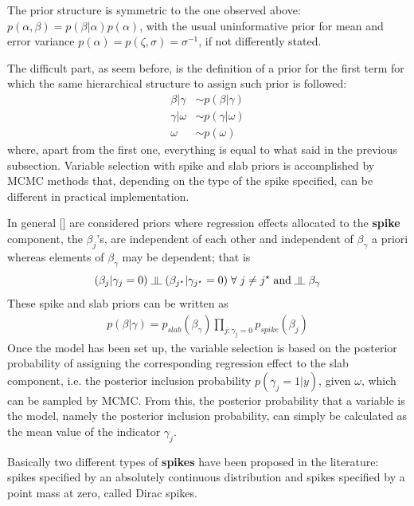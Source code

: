 \documentclass[11 pt]{article}
\begin{document}
\begin{multicols}{2}
The prior structure is symmetric to the one observed above: $p(\alpha, \beta) = p(\beta|\alpha)p(\alpha)$, 
with the usual uninformative prior for mean and error variance $p(\alpha) = p(\zeta, \sigma) = \sigma^{-1}$, if not differently stated.

The difficult part, as seem before, is the definition of a prior for the first term for which the same hierarchical structure to assign such prior is followed:
\begin{align*}
    \beta|\gamma &\sim p(\beta|\gamma)\\
    \gamma|\omega&\sim p(\gamma|\omega)\\
    \omega &\sim p(\omega)
\end{align*}
where, apart from the first one, everything is equal to what said in the previous subsection. Variable selection with spike and slab priors is accomplished by MCMC methods that, depending on the type of the spike specified, can be different in practical implementation.

\newcommand{\indep}{\rotatebox[origin=c]{90}{$\models$}}

In general [\cite{Spike2011}] are considered priors where regression effects allocated to the \textbf{spike} component, the $\beta_j$'s, are independent of each other and independent of $\beta_\gamma$ a priori whereas elements of $\beta_\gamma$ may be dependent; that is $$(\beta_j|\gamma_j = 0) \; \indep \; (\beta_{j^\star}|\gamma_{j^\star}=0) \; \forall \;j \neq j^\star\; \text{and} \;\indep \;\beta_\gamma$$ These spike and slab priors can be written as
\begin{align*}
    p(\beta|\gamma) = p_{slab}(\beta_\gamma) \prod_{j: \gamma_j = 0}p_{spike}(\beta_j)
\end{align*}
Once the model has been set up, the variable selection is based on the posterior probability of assigning the corresponding regression effect to the slab component, i.e. the posterior inclusion probability $p(\gamma_j = 1|y)$, given $\omega$, which can be sampled by MCMC. From this, the posterior probability that a variable is  the model, namely the posterior inclusion probability, can simply be calculated as the mean value of the indicator $\gamma_j$.

Basically two different types of \textbf{spikes} have been proposed in the literature: spikes specified by an absolutely continuous distribution and spikes specified by a point mass at zero, called Dirac spikes.


\end{multicols}
\end{document}
